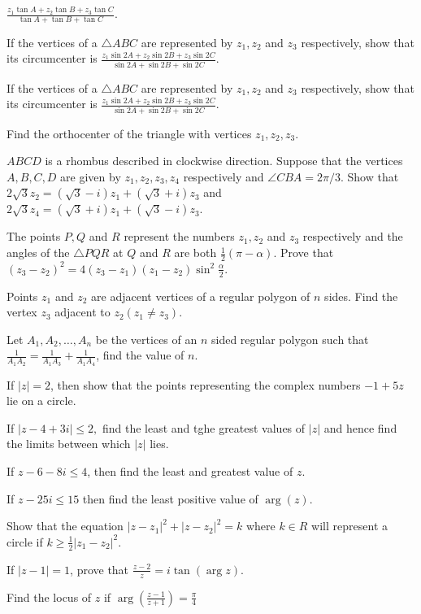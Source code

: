   $\frac{z_1\tan A + z_2\tan B + z_3\tan C}{\tan A + \tan B + \tan C}$.
\item If the vertices of a $\triangle ABC$ are represented by $z_1, z_2$ and $z_3$ respectively, show that its
  circumcenter is $\frac{z_1\sin 2A + z_2\sin 2B + z_3\sin 2C}{\sin 2A + \sin 2B + \sin 2C}$.
\item If the vertices of a $\triangle ABC$ are represented by $z_1, z_2$ and $z_3$ respectively, show that its
  circumcenter is $\frac{z_1\sin 2A + z_2\sin 2B + z_3\sin 2C}{\sin 2A + \sin 2B + \sin 2C}$.
\item Find the orthocenter of the triangle with vertices $z_1, z_2, z_3$.
\item $ABCD$ is a rhombus described in clockwise direction. Suppose that the vertices $A, B, C, D$ are given by $z_1,
  z_2, z_3, z_4$ respectively and $\angle CBA = 2\pi/3$. Show that $2\sqrt{3}z_2 = (\sqrt{3} - i)z_1 + (\sqrt{3} + i)z_3$ and
  $2\sqrt{3}z_4 = (\sqrt{3} + i)z_1 + (\sqrt{3} - i)z_3$.
\item The points $P, Q$ and $R$ represent the numbers $z_1, z_2$ and $z_3$ respectively and the angles of the $\triangle
  PQR$ at $Q$ and $R$ are both $\frac{1}{2}(\pi - \alpha)$. Prove that $(z_3 - z_2)^2 = 4(z_3 - z_1)(z_1 -
  z_2)\sin^2\frac{\alpha}{2}$.
\item Points $z_1$ and $z_2$ are adjacent vertices of a regular polygon of $n$ sides. Find the vertex $z_3$ adjacent to
  $z_2(z_1\neq z_3)$.
\item Let $A_1, A_2, \ldots, A_n$ be the vertices of an $n$ sided regular polygon such that $\frac{1}{A_1A_2} =
  \frac{1}{A_1A_3} + \frac{1}{A_1A_4}$, find the value of $n$.
\item If $|z| = 2$, then show that the points representing the complex numbers $-1 + 5z$ lie on a circle.
\item If $|z - 4 + 3i|\leq 2,$ find the least and tghe greatest values of $|z|$ and hence find the limits between which
  $|z|$ lies.
\item If $z - 6 - 8i\leq 4$, then find the least and greatest value of $z$.
\item If $z - 25i\leq 15$ then find the least positive value of $\arg(z)$.
\item Show that the equation $|z - z_1|^2 + |z - z_2|^2 = k$ where $k\in R$ will represent a circle if $k\geq \frac{1}{2}|z_1 -
  z_2|^2$.
\item If $|z - 1| = 1$, prove that $\frac{z - 2}{z} = i\tan(\arg z)$.
\item Find the locus of $z$ if $\arg\left(\frac{z - 1}{z + 1}\right) = \frac{\pi}{4}$
